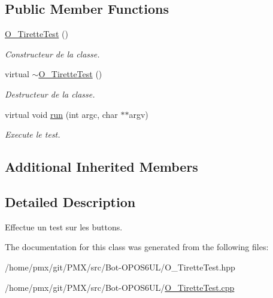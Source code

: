 \subsection*{Public Member Functions}
\begin{DoxyCompactItemize}
\item 
\mbox{\label{classO__TiretteTest_aaf18111a258e5ed43f432e5766afa4a4}} 
\hyperlink{classO__TiretteTest_aaf18111a258e5ed43f432e5766afa4a4}{O\+\_\+\+Tirette\+Test} ()
\begin{DoxyCompactList}\small\item\em Constructeur de la classe. \end{DoxyCompactList}\item 
\mbox{\label{classO__TiretteTest_ad568ab01668a8d3e8fd6569318ee8a9a}} 
virtual \hyperlink{classO__TiretteTest_ad568ab01668a8d3e8fd6569318ee8a9a}{$\sim$\+O\+\_\+\+Tirette\+Test} ()
\begin{DoxyCompactList}\small\item\em Destructeur de la classe. \end{DoxyCompactList}\item 
\mbox{\label{classO__TiretteTest_a66d6839aab8764140c00e77046ac4563}} 
virtual void \hyperlink{classO__TiretteTest_a66d6839aab8764140c00e77046ac4563}{run} (int argc, char $\ast$$\ast$argv)
\begin{DoxyCompactList}\small\item\em Execute le test. \end{DoxyCompactList}\end{DoxyCompactItemize}
\subsection*{Additional Inherited Members}


\subsection{Detailed Description}
Effectue un test sur les buttons. 

The documentation for this class was generated from the following files\+:\begin{DoxyCompactItemize}
\item 
/home/pmx/git/\+P\+M\+X/src/\+Bot-\/\+O\+P\+O\+S6\+U\+L/O\+\_\+\+Tirette\+Test.\+hpp\item 
/home/pmx/git/\+P\+M\+X/src/\+Bot-\/\+O\+P\+O\+S6\+U\+L/\hyperlink{O__TiretteTest_8cpp}{O\+\_\+\+Tirette\+Test.\+cpp}\end{DoxyCompactItemize}

